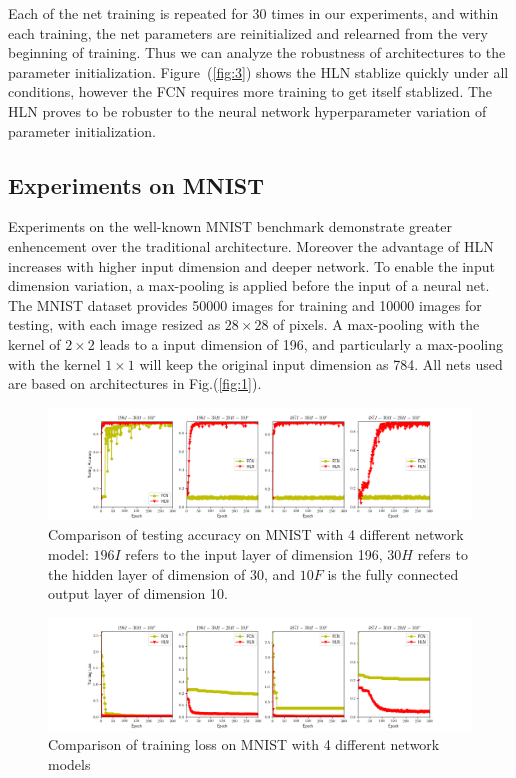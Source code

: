 \documentclass[3p,times,procedia]{elsarticle}
\begin{document}
Each of the net training is repeated for 
30 times in our experiments, and within
each training, the net parameters are
reinitialized and relearned from the
very beginning of training. Thus we
can analyze the robustness of 
architectures to the parameter
initialization.
Figure~(\ref{fig:3}) shows the HLN
stablize quickly under all conditions,
however the FCN requires more training
to get itself stablized. The HLN proves
to be robuster to the neural network
hyperparameter variation of parameter 
initialization.
\subsection{Experiments on MNIST}
Experiments on the well-known MNIST
benchmark demonstrate greater enhencement
over the traditional architecture.
Moreover the advantage of HLN increases 
with higher input dimension
and deeper network. 
To enable the input dimension variation,
a max-pooling is applied before the input
of a neural net. The MNIST dataset
provides 50000 images for training and 
10000 images for testing, with each image
resized as $28\times 28$ of pixels. 
A max-pooling with the kernel of 
$2\times 2$
leads to a input dimension of 196, and
particularly a max-pooling with the
kernel $1\times 1$ will keep the original
input dimension as 784. All nets used
are based on architectures in 
Fig.(\ref{fig:1}).

\begin{figure}[h]
	\centerline{
		\includegraphics[width=7in]{mnist_testing_accuracy}}
	\caption{
		Comparison of testing accuracy on 
		MNIST with 4 different network
		model: 
		$196I$ refers to
		the input layer of dimension 196, 
		$30H$ refers to the hidden layer
		of dimension of 30, and $10F$ is
		the fully connected output layer 
		of dimension 10.
		}
	\label{fig:4}
\end{figure}

\begin{figure}[h]
	\centerline{
		\includegraphics[width=7in]{mnist_training_loss}}
	\caption{
		Comparison of training loss on 
		MNIST with 4 different network models
		}
	\label{fig:5}
\end{figure}
\end{document}
